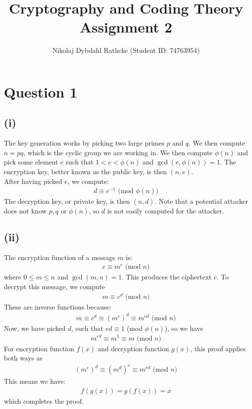 \documentclass[a4paper, fleqn]{article}
\author{Nikolaj Dybdahl Rathcke (Student ID: 74763954)}
\title{Cryptography and Coding Theory \\ Assignment 2}
\begin{document}
%

\section{Question 1}
\subsection{(i)}
The key generation works by picking two large primes $p$ and $q$. We then compute $n=pq$, which is the cyclic group we are working in. We then compute $\phi(n)$ and pick some element $e$ such that $1<e<\phi(n)$ and $\gcd(e,\phi(n))=1$. The encryption key, better known as the public key, is then $(n,e)$. \\
After having picked $e$, we compute:
\begin{align}\label{eq1}
  d\equiv e^{-1} \mbox{ (mod $\phi(n)$)}
\end{align}
The decryption key, or private key, is then $(n, d)$. Note that a potential attacker does not know $p,q$ or $\phi(n)$, so $d$ is not easily computed for the attacker.

\subsection{(ii)}
The encryption function of a message $m$ is:
\begin{align*}
  c\equiv m^e \mbox{ (mod $n$)}
\end{align*}
where $0\leq m\leq n$ and $\gcd(m,n)=1$. This produces the ciphertext $c$. To decrypt this message, we compute
\begin{align*}
  m \equiv c^d \mbox{ (mod $n$)}
\end{align*}
These are inverse functions because:
\begin{align*}
  m \equiv c^d \equiv (m^e)^d \equiv m^{ed} \mbox{ (mod $n$)}
\end{align*}
Now, we have picked $d$, such that $ed\equiv 1$ (mod $\phi(n)$), so we have
\begin{align*}
  m^{ed}\equiv m^1\equiv m \mbox{ (mod $n$)}
\end{align*}
For encryption function $f(x)$ and decryption function $g(x)$, this proof applies both ways as \begin{align*}
  (m^e)^d\equiv (m^d)^e\equiv m^{ed} \mbox { (mod $n$)}
\end{align*}
This means we have:
\begin{align*}
  f(g(x))=g(f(x))=x
\end{align*}
which completes the proof.
\end{document}
